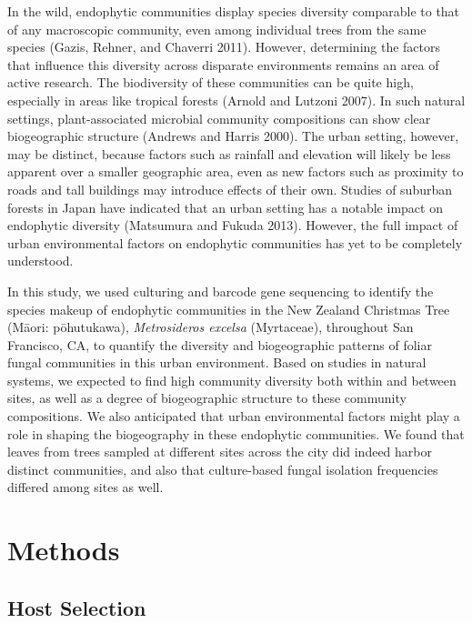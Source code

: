 \documentclass[fleqn,10pt,lineno]{wlpeerj} %
\begin{document}
In the wild, endophytic communities display species diversity comparable to that of any macroscopic community, even among individual trees from the same species (Gazis, Rehner, and Chaverri 2011). However, determining the factors that influence this diversity across disparate environments remains an area of active research. The biodiversity of these communities can be quite high, especially in areas like tropical forests (Arnold and Lutzoni 2007). In such natural settings, plant-associated microbial community compositions can show clear biogeographic structure (Andrews and Harris 2000). The urban setting, however, may be distinct, because factors such as rainfall and elevation will likely be less apparent over a smaller geographic area, even as new factors such as proximity to roads and tall buildings may introduce effects of their own. Studies of suburban forests in Japan have indicated that an urban setting has a notable impact on endophytic diversity (Matsumura and Fukuda 2013). However, the full impact of urban environmental factors on endophytic communities has yet to be completely understood.

In this study, we used culturing and barcode gene sequencing to identify the species makeup of endophytic communities in the New Zealand Christmas Tree (Māori: pōhutukawa), \emph{Metrosideros excelsa} (Myrtaceae), throughout San Francisco, CA, to quantify the diversity and biogeographic patterns of foliar fungal communities in this urban environment. Based on studies in natural systems, we expected to find high community diversity both within and between sites, as well as a degree of biogeographic structure to these community compositions. We also anticipated that urban environmental factors might play a role in shaping the biogeography in these endophytic communities. We found that leaves from trees sampled at different sites across the city did indeed harbor distinct communities, and also that culture-based fungal isolation frequencies differed among sites as well.

\hypertarget{methods}{%
\section*{Methods}\label{methods}}

\hypertarget{host-selection}{%
\subsection*{Host Selection}\label{host-selection}}
\end{document}
